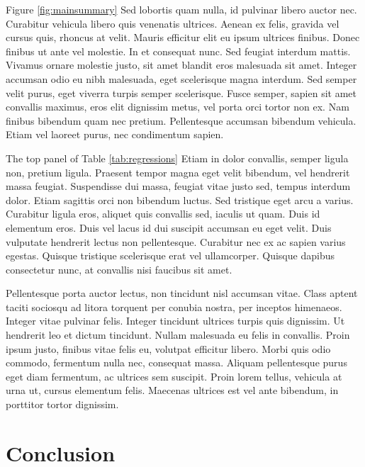 \documentclass[12pt]{article}
\begin{document}


Figure \ref{fig:mainsummary} Sed lobortis quam nulla, id pulvinar libero auctor nec. Curabitur vehicula libero quis venenatis ultrices. Aenean ex felis, gravida vel cursus quis, rhoncus at velit. Mauris efficitur elit eu ipsum ultrices finibus. Donec finibus ut ante vel molestie. In et consequat nunc. Sed feugiat interdum mattis. Vivamus ornare molestie justo, sit amet blandit eros malesuada sit amet. Integer accumsan odio eu nibh malesuada, eget scelerisque magna interdum. Sed semper velit purus, eget viverra turpis semper scelerisque. Fusce semper, sapien sit amet convallis maximus, eros elit dignissim metus, vel porta orci tortor non ex. Nam finibus bibendum quam nec pretium. Pellentesque accumsan bibendum vehicula. Etiam vel laoreet purus, nec condimentum sapien.



The top panel of Table \ref{tab:regressions} Etiam in dolor convallis, semper ligula non, pretium ligula. Praesent tempor magna eget velit bibendum, vel hendrerit massa feugiat. Suspendisse dui massa, feugiat vitae justo sed, tempus interdum dolor. Etiam sagittis orci non bibendum luctus. Sed tristique eget arcu a varius. Curabitur ligula eros, aliquet quis convallis sed, iaculis ut quam. Duis id elementum eros. Duis vel lacus id dui suscipit accumsan eu eget velit. Duis vulputate hendrerit lectus non pellentesque. Curabitur nec ex ac sapien varius egestas. Quisque tristique scelerisque erat vel ullamcorper. Quisque dapibus consectetur nunc, at convallis nisi faucibus sit amet.

Pellentesque porta auctor lectus, non tincidunt nisl accumsan vitae. Class aptent taciti sociosqu ad litora torquent per conubia nostra, per inceptos himenaeos. Integer vitae pulvinar felis. Integer tincidunt ultrices turpis quis dignissim. Ut hendrerit leo et dictum tincidunt. Nullam malesuada eu felis in convallis. Proin ipsum justo, finibus vitae felis eu, volutpat efficitur libero. Morbi quis odio commodo, fermentum nulla nec, consequat massa. Aliquam pellentesque purus eget diam fermentum, ac ultrices sem suscipit. Proin lorem tellus, vehicula at urna ut, cursus elementum felis. Maecenas ultrices est vel ante bibendum, in porttitor tortor dignissim.

\section{Conclusion\label{sec:conclusion}}
\end{document}

